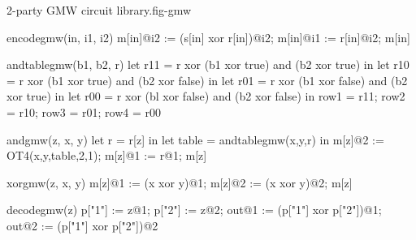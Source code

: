 \begin{fpfig}[t]{2-party GMW circuit library.}{fig-gmw}
{\footnotesize
  \begin{verbatimtab}
    encodegmw(in, i1, i2) {
      m[in]@i2 := (s[in] xor r[in])@i2;
      m[in]@i1 := r[in]@i2;
      m[in]
    }
    
    andtablegmw(b1, b2, r) {
      let r11 = r xor (b1 xor true) and (b2 xor true) in
      let r10 = r xor (b1 xor true) and (b2 xor false) in
      let r01 = r xor (b1 xor false) and (b2 xor true) in
      let r00 = r xor (bl xor false) and (b2 xor false) in
      { row1 = r11; row2 = r10; row3 = r01; row4 = r00 }
    }
    
    andgmw(z, x, y) {
      let r = r[z] in
      let table = andtablegmw(x,y,r) in
      m[z]@2 := OT4(x,y,table,2,1);
      m[z]@1 := r@1;
      m[z]
    }
    
    xorgmw(z, x, y)
    { m[z]@1 := (x xor y)@1; m[z]@2 := (x xor y)@2; m[z] }
    
    decodegmw(z) {
      p["1"] := z@1; p["2"] := z@2;
      out@1 := (p["1"] xor p["2"])@1;
      out@2 := (p["1"] xor p["2"])@2
    }
  \end{verbatimtab}
}
\end{fpfig}
